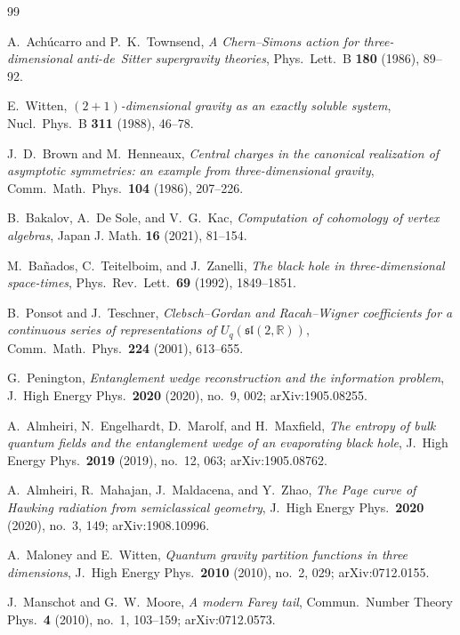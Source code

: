 \documentclass[11pt,reqno]{amsart}
\theoremstyle{definition}
\theoremstyle{remark}
\begin{document}
\begin{thebibliography}{99}

A.~Ach\'ucarro and P.~K.~Townsend,
\textit{A Chern--Simons action for three-dimensional
anti-de~Sitter supergravity theories},
Phys.\ Lett.\ B \textbf{180} (1986), 89--92.

E.~Witten,
\textit{$(2+1)$-dimensional gravity as an exactly soluble system},
Nucl.\ Phys.\ B \textbf{311} (1988), 46--78.

J.~D.~Brown and M.~Henneaux,
\textit{Central charges in the canonical realization of asymptotic
symmetries: an example from three-dimensional gravity},
Comm.\ Math.\ Phys.\ \textbf{104} (1986), 207--226.

B.~Bakalov, A.~De Sole, and V.~G.~Kac,
\textit{Computation of cohomology of vertex algebras},
Japan J. Math. \textbf{16} (2021), 81--154.

M.~Ba\~nados, C.~Teitelboim, and J.~Zanelli,
\textit{The black hole in three-dimensional space-times},
Phys.\ Rev.\ Lett.\ \textbf{69} (1992), 1849--1851.

B.~Ponsot and J.~Teschner,
\textit{Clebsch--Gordan and Racah--Wigner coefficients for a
continuous series of representations of $U_q(\mathfrak{sl}(2,\mathbb{R}))$},
Comm.\ Math.\ Phys.\ \textbf{224} (2001), 613--655.

G.~Penington,
\textit{Entanglement wedge reconstruction and the information problem},
J.\ High Energy Phys.\ \textbf{2020} (2020), no.~9, 002;
arXiv:1905.08255.

A.~Almheiri, N.~Engelhardt, D.~Marolf, and H.~Maxfield,
\textit{The entropy of bulk quantum fields and the entanglement
wedge of an evaporating black hole},
J.\ High Energy Phys.\ \textbf{2019} (2019), no.~12, 063;
arXiv:1905.08762.

A.~Almheiri, R.~Mahajan, J.~Maldacena, and Y.~Zhao,
\textit{The Page curve of Hawking radiation from semiclassical geometry},
J.\ High Energy Phys.\ \textbf{2020} (2020), no.~3, 149;
arXiv:1908.10996.

A.~Maloney and E.~Witten,
\textit{Quantum gravity partition functions in three dimensions},
J.\ High Energy Phys.\ \textbf{2010} (2010), no.~2, 029;
arXiv:0712.0155.

J.~Manschot and G.~W.~Moore,
\textit{A modern Farey tail},
Commun.\ Number Theory Phys.\ \textbf{4} (2010), no.~1, 103--159;
arXiv:0712.0573.

\end{thebibliography}
\end{document}
